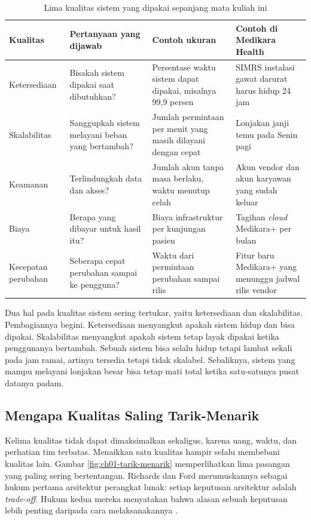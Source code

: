 \begin{table}[!htb]
  \centering
  \footnotesize
  \caption{Lima kualitas sistem yang dipakai sepanjang mata kuliah ini}
  \label{tab:ch01-kualitas}
  \begin{tabularx}{\textwidth}{P{1.9cm}LLL}
    \hline
    \textbf{Kualitas} & \textbf{Pertanyaan yang dijawab} & \textbf{Contoh ukuran} &
      \textbf{Contoh di Medikara Health} \\
    \hline
    Ketersediaan & Bisakah sistem dipakai saat dibutuhkan? & Persentase waktu sistem
      dapat dipakai, misalnya 99,9 persen & SIMRS instalasi gawat darurat harus hidup
      24 jam \\
    \hline
    Skalabilitas & Sanggupkah sistem melayani beban yang bertambah? & Jumlah permintaan
      per menit yang masih dilayani dengan cepat & Lonjakan janji temu pada Senin
      pagi \\
    \hline
    Keamanan & Terlindungkah data dan akses? & Jumlah akun tanpa masa berlaku, waktu
      menutup celah & Akun vendor dan akun karyawan yang sudah keluar \\
    \hline
    Biaya & Berapa yang dibayar untuk hasil itu? & Biaya infrastruktur per kunjungan
      pasien & Tagihan \textit{cloud} Medikara+ per bulan \\
    \hline
    Kecepatan perubahan & Seberapa cepat perubahan sampai ke pengguna? & Waktu dari
      permintaan perubahan sampai rilis & Fitur baru Medikara+ yang menunggu jadwal
      rilis vendor \\
    \hline
  \end{tabularx}
\end{table}

Dua hal pada kualitas sistem sering tertukar, yaitu ketersediaan dan skalabilitas.
Pembagiannya begini. Ketersediaan menyangkut apakah sistem hidup dan bisa dipakai.
Skalabilitas menyangkut apakah sistem tetap layak dipakai ketika penggunanya bertambah.
Sebuah sistem bisa selalu hidup tetapi lambat sekali pada jam ramai, artinya tersedia
tetapi tidak skalabel. Sebaliknya, sistem yang mampu melayani lonjakan besar bisa tetap
mati total ketika satu-satunya pusat datanya padam.

\subsection{Mengapa Kualitas Saling Tarik-Menarik}

Kelima kualitas tidak dapat dimaksimalkan sekaligus, karena uang, waktu, dan perhatian
tim terbatas. Menaikkan satu kualitas hampir selalu membebani kualitas lain. Gambar
\ref{fig:ch01-tarik-menarik} memperlihatkan lima pasangan yang paling sering
bertentangan. Richards dan Ford merumuskannya sebagai hukum pertama arsitektur perangkat
lunak: setiap keputusan arsitektur adalah \textit{trade-off}. Hukum kedua mereka
menyatakan bahwa alasan sebuah keputusan lebih penting daripada cara melaksanakannya
\cite{richards2025}.

